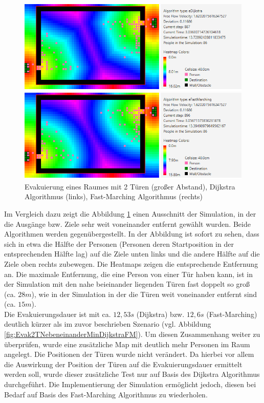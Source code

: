 \begin{figure}[!htb]
	\centering
	\begin{minipage}{.5\textwidth}
		\centering
		\includegraphics[width=\textwidth]{abbildungen/Evak2DMitte.PNG}
	\end{minipage}%
	\begin{minipage}{0.5\textwidth}
		\centering
		\includegraphics[width=\textwidth]{abbildungen/Evak2FMMitte.PNG}
	\end{minipage}
	\caption{Evakuierung eines Raumes mit 2 Türen (großer Abstand), Dijkstra Algorithmus (links), Fast-Marching Algorithmus (rechts)}
	\label{fig:Evak2TNebeneinanderMaxDijkstraFM}
	\end{figure}

Im Vergleich dazu zeigt die Abbildung \ref{fig:Evak2TNebeneinanderMaxDijkstraFM}   einen Ausschnitt der Simulation, in der die Ausgänge bzw. Ziele sehr weit voneinander entfernt gewählt wurden. Beide Algorithmen werden gegenübergestellt. In der Abbildung ist sofort zu sehen, dass sich in etwa die Hälfte der Personen (Personen deren Startposition in der entsprechenden Hälfte lag) auf die Ziele unten links und die andere Hälfte auf die Ziele oben rechts zubewegen. Die Heatmaps zeigen die entsprechende Entfernung an. Die maximale Entfernung, die eine Person von einer Tür haben kann, ist in der Simulation mit den nahe beieinander liegenden Türen fast doppelt so groß (ca. $28m$), wie in der Simulation in der die Türen weit voneinander entfernt sind (ca. $15m$).  \\
Die Evakuierungsdauer ist mit ca. $12,53s$ (Dijkstra) bzw. $12,6s$ (Fast-Marching) deutlich kürzer als im zuvor beschrieben Szenario (vgl. Abbildung \ref{fig:Evak2TNebeneinanderMinDijkstraFM}). Um diesen Zusammenhang weiter zu überprüfen, wurde eine zusätzliche Map mit deutlich mehr Personen im Raum angelegt. Die Positionen der Türen wurde nicht verändert. Da hierbei vor allem die Auswirkung der Position der Türen auf die Evakuierungsdauer ermittelt werden soll, wurde dieser zusätzliche Test nur auf Basis des Dijkstra Algorithmus durchgeführt. Die Implementierung der Simulation ermöglicht jedoch, diesen bei Bedarf auf Basis des Fast-Marching Algorithmus zu wiederholen.\\

